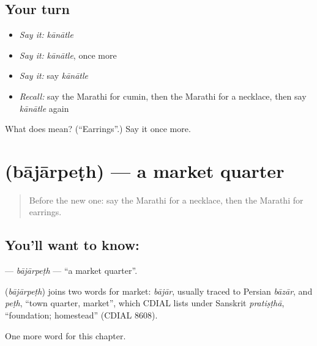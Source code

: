 \subsection*{Your turn}
\begin{itemize}
\raggedright
  \item \emph{Say it:} \emph{kānātle}
  \item \emph{Say it:} \emph{kānātle}, once more
  \item \emph{Say it:} say \emph{kānātle}
  \item \emph{Recall:} say the Marathi for cumin, then the Marathi for a necklace, then say \emph{kānātle} again
\end{itemize}

\begin{tcolorbox}[breakable,colback=teal!4,colframe=teal!35!black,title={Before you move on}]
What does  mean? (\textquotedblleft{}Earrings\textquotedblright{}.) Say it once more.
\end{tcolorbox}
\section[\texorpdfstring{\mr{बाजारपेठ} (bājārpeṭh)}{बाजारपेठ (bājārpeṭh)}]{ (bājārpeṭh) — a market quarter}

\label{lesson:MR-C217-bajarpeth}



\begin{quote}
Before the new one: say the Marathi for a necklace, then the Marathi for earrings.
\end{quote}

\subsection*{You'll want to know: }
\textbf{} — \emph{bājārpeṭh} — \textquotedblleft{}a market quarter\textquotedblright{}.

\begin{cousinweb}
\textbf{} (\emph{bājārpeṭh}) joins two words for market: \emph{bājār}, usually traced to Persian \emph{bāzār}, and \emph{peṭh}, \textquotedblleft{}town quarter, market\textquotedblright{}, which CDIAL lists under Sanskrit \emph{pratiṣṭhā}, \textquotedblleft{}foundation; homestead\textquotedblright{} (CDIAL 8608).
\end{cousinweb}

\begin{grammarlens}[title={What you've built}]
One more word for this chapter.
\end{grammarlens}

